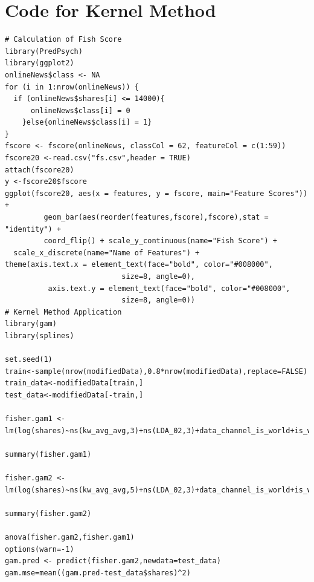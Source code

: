 \documentclass[letterpaper,12pt]{article}
\begin{document}
\section{Code for Kernel Method}
\begin{lstlisting}
# Calculation of Fish Score
library(PredPsych)
library(ggplot2)
onlineNews$class <- NA
for (i in 1:nrow(onlineNews)) {
  if (onlineNews$shares[i] <= 14000){
      onlineNews$class[i] = 0
    }else{onlineNews$class[i] = 1}
}
fscore <- fscore(onlineNews, classCol = 62, featureCol = c(1:59))
fscore20 <-read.csv("fs.csv",header = TRUE)
attach(fscore20)
y <-fscore20$fscore
ggplot(fscore20, aes(x = features, y = fscore, main="Feature Scores")) +
         geom_bar(aes(reorder(features,fscore),fscore),stat = "identity") +
         coord_flip() + scale_y_continuous(name="Fish Score") +
  scale_x_discrete(name="Name of Features") +
theme(axis.text.x = element_text(face="bold", color="#008000",
                           size=8, angle=0),
          axis.text.y = element_text(face="bold", color="#008000",
                           size=8, angle=0))
# Kernel Method Application
library(gam)
library(splines)

set.seed(1)
train<-sample(nrow(modifiedData),0.8*nrow(modifiedData),replace=FALSE)
train_data<-modifiedData[train,]
test_data<-modifiedData[-train,]

fisher.gam1 <- lm(log(shares)~ns(kw_avg_avg,3)+ns(LDA_02,3)+data_channel_is_world+is_weekend+data_channel_is_socmed+weekday_is_saturday+ns(LDA_04,3)+ns(data_channel_is_entertainment,3)+data_channel_is_tech+ns(kw_max_avg,4)+weekday_is_sunday+ns(LDA_00,3)+ns(num_hrefs,3)+ns(global_subjectivity,3)+ns(kw_min_avg,3)+ns(global_sentiment_polarity,3)+ns(rate_negative_words,3)+ns(kw_min_min,3)+ns(title_subjectivity,3)+ns(LDA_01,3),data=train_data)

summary(fisher.gam1)

fisher.gam2 <- lm(log(shares)~ns(kw_avg_avg,5)+ns(LDA_02,3)+data_channel_is_world+is_weekend+data_channel_is_socmed+weekday_is_saturday+ns(LDA_04)+ns(data_channel_is_entertainment)+data_channel_is_tech+ns(kw_max_avg,4)+weekday_is_sunday+LDA_00+ns(num_hrefs)+ns(global_subjectivity)+ns(kw_min_avg,3)+ns(global_sentiment_polarity)+rate_negative_words+ns(kw_min_min)+ns(title_subjectivity,2)+LDA_01,data=train_data)

summary(fisher.gam2)

anova(fisher.gam2,fisher.gam1)
options(warn=-1) 
gam.pred <- predict(fisher.gam2,newdata=test_data)
gam.mse=mean((gam.pred-test_data$shares)^2)
\end{lstlisting}
\end{document}
